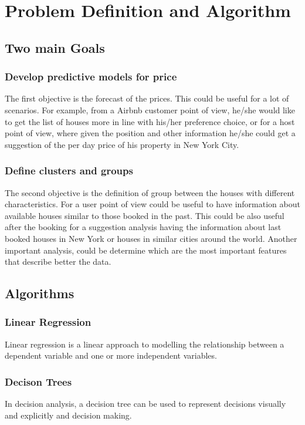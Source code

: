 \documentclass{FR16}
\begin{document}
\newpage
\section{Problem Definition and Algorithm}
\subsection{Two main Goals}

\subsubsection{Develop predictive models for price}
The first objective is the forecast of the prices. This could be useful for a lot of scenarios. For example, from a Airbnb customer point of view, he/she would like to get the list of houses more in line with his/her preference choice, or for a host point of view, where given the position and other information he/she could get a suggestion of the per day price of his property in New York City. 

\subsubsection{Define clusters and groups}
The second objective is the definition of group between the houses with different characteristics. For a user point of view could be useful to have information about available houses similar to those booked in the past. This could be also useful after the booking for a suggestion analysis having the information about last booked houses in New York or houses in similar cities around the world. Another important analysis, could be determine which are the most important features that describe better the data. 
\newpage
\subsection{Algorithms}
\subsubsection{Linear Regression}
 Linear regression  is a linear approach to modelling the relationship between a dependent variable and one or more independent variables. 
 
  \subsubsection{Decison Trees}
In decision analysis, a decision tree can be used to represent decisions visually and explicitly and decision making.
\end{document}
